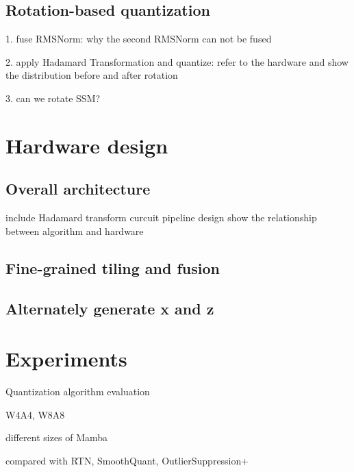 \subsection*{Rotation-based quantization}
    1. fuse RMSNorm: why the second RMSNorm can not be fused
    
    2. apply Hadamard Transformation and quantize: refer to the hardware and show the distribution before and after rotation

    3. can we rotate SSM?
    
    


\section*{Hardware design}
\subsection*{Overall architecture} 
    include Hadamard transform curcuit
    pipeline design
    show the relationship between algorithm and hardware
\subsection*{Fine-grained tiling and fusion}
\subsection*{Alternately generate x and z}


\section*{Experiments}
Quantization algorithm evaluation

W4A4, W8A8

different sizes of Mamba

compared with RTN, SmoothQuant, OutlierSuppression+
